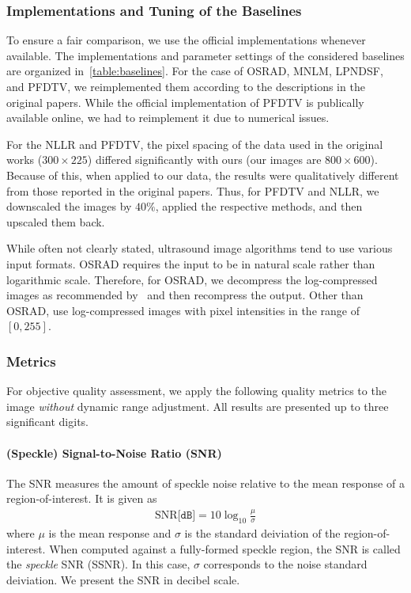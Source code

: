 \subsubsection{Implementations and Tuning of the Baselines}
To ensure a fair comparison, we use the official implementations whenever available.
The implementations and parameter settings of the considered baselines are organized in~\cref{table:baselines}.
For the case of OSRAD, MNLM, LPNDSF, and PFDTV, we reimplemented them according to the descriptions in the original papers.
While the official implementation of PFDTV is publically available online, we had to reimplement it due to numerical issues.

For the NLLR and PFDTV, the pixel spacing of the data used in the original works (\(300 \times 225\)) differed significantly with ours (our images are \(800 \times 600\)).
Because of this, when applied to our data, the results were qualitatively different from those reported in the original papers.
Thus, for PFDTV and NLLR, we downscaled the images by \(40\%\), applied the respective methods, and then upscaled them back.

While often not clearly stated, ultrasound image algorithms tend to use various input formats.
OSRAD requires the input to be in natural scale rather than logarithmic scale.
Therefore, for OSRAD, we decompress the log-compressed images as recommended by~\cite{yongjianyu_generalized_2004} and then recompress the output.
Other than OSRAD, use log-compressed images with pixel intensities in the range of \([0, 255]\).

\subsubsection{Metrics}
For objective quality assessment, we apply the following quality metrics to the image \textit{without} dynamic range adjustment.
All results are presented up to three significant digits.

\paragraph{(Speckle) Signal-to-Noise Ratio (SNR)}
The SNR measures the amount of speckle noise relative to the mean response of a region-of-interest.
It is given as
\begin{align}
  \mathrm{SNR} \texttt{[dB]} = 10 \log_{10} \frac{\mu}{\sigma}
\end{align}
where \(\mu\) is the mean response and \(\sigma\) is the standard deiviation of the region-of-interest.
When computed against a fully-formed speckle region, the SNR is called the \textit{speckle} SNR (SSNR).
In this case, \(\sigma\) corresponds to the noise standard deiviation.
We present the SNR in decibel scale.

